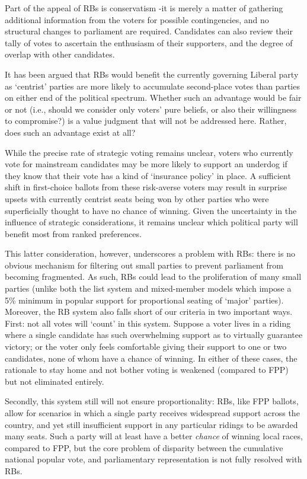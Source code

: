Part of the appeal of RBs is conservatism \--it is merely a matter of gathering additional information from the voters for possible contingencies, and no structural changes to parliament are required. Candidates can also review their tally of votes to ascertain the enthusiasm of their supporters, and the degree of overlap with other candidates. 

It has been argued\cite{Record} that RBs would benefit the currently governing Liberal party as `centrist' parties are more likely to accumulate second-place votes than parties on either end of the political spectrum. 
Whether such an advantage would be fair or not (i.e., should we consider only voters' pure beliefs, or also their willingness to compromise?) is a value judgment that will not be addressed here. Rather, does such an advantage exist at all?

While the precise rate of strategic voting remains unclear, voters who currently vote for mainstream candidates may be more likely to support an underdog if they know that their vote has a kind of `insurance policy' in place. 
A sufficient shift in first-choice ballots from these risk-averse voters may result in surprise upsets with currently centrist seats being won by other parties who were superficially thought to have no chance of winning. 
Given the uncertainty in the influence of strategic considerations, it remains  unclear which political party will benefit most from ranked preferences. 

This latter consideration, however, underscores a problem with RBs:  there is no obvious mechanism for filtering out small parties to prevent parliament from becoming fragmented. As such, RBs could lead to the proliferation of many small parties
(unlike both the list system and  mixed-member models which impose a 5\% minimum in popular support for proportional seating of `major' parties). 
Moreover, the RB system also falls short of our criteria in two important ways.
First: not all votes will `count' in this system. 
Suppose a voter lives in a riding where a single candidate has such overwhelming support as to virtually guarantee victory; or the voter only feels comfortable giving their support to one or two candidates, none of whom have a chance of winning. 
In either of these cases, the rationale to stay home and not bother voting is weakened (compared to FPP) but not eliminated entirely. 

Secondly, this system still will not ensure proportionality: RBs, like FPP ballots, allow for scenarios in which a single party receives widespread support across the country, and yet still insufficient support in any particular ridings to be awarded many seats. Such a party will at least have a better \emph{chance} of winning local races, compared to FPP, but the core problem of disparity between the cumulative national popular vote, and parliamentary representation is not fully resolved with RBs.

